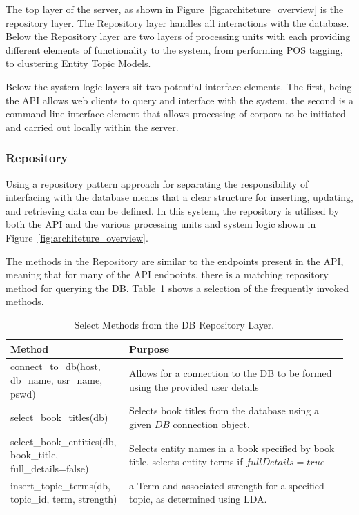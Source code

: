 \documentclass[10pt]{report}
\begin{document}
The top layer of the server, as shown in Figure~\ref{fig:architeture_overview} is the repository layer. The Repository layer handles all interactions with the database. Below the Repository layer are two layers of processing units with each providing different elements of functionality to the system, from performing POS tagging, to clustering Entity Topic Models.

Below the system logic layers sit two potential interface elements. The first, being the API allows web clients to query and interface with the system, the second is a command line interface element that allows processing of corpora to be initiated and carried out locally within the server.

\subsubsection{Repository}
Using a repository pattern approach for separating the responsibility of interfacing with the database means that a clear structure for inserting, updating, and retrieving data can be defined. In this system, the repository is utilised by both the API and the various processing units and system logic shown in Figure~\ref{fig:architeture_overview}.

The methods in the Repository are similar to the endpoints present in the API, meaning that for many of the API endpoints, there is a matching repository method for querying the DB. Table~\ref{tab:repository_methods} shows a selection of the frequently invoked methods.

\renewcommand{\arraystretch}{2.0}
\renewcommand{\baselinestretch}{1.0}\normalsize
\begin{table}[h!]
  \centering
  \begin{tabular}{>{\raggedright}p{0.34\linewidth} | p{0.63\linewidth}}
    Method & Purpose\\
    \hline
    connect\_to\_db(host, db\_name, usr\_name, pswd) & Allows for a connection to the DB to be formed using the provided user details\\
    select\_book\_titles(db) & Selects book titles from the database using a given $DB$ connection object.\\
    select\_book\_entities(db, book\_title, full\_details=false) & Selects entity names in a book specified by book title, selects entity terms if $fullDetails=true$\\
    insert\_topic\_terms(db, topic\_id, term, strength) & a Term and associated strength for a specified topic, as determined using LDA. \\
    
  \end{tabular}
  \caption{Select Methods from the DB Repository Layer. \label{tab:repository_methods}}
\end{table}
\renewcommand{\arraystretch}{1.0}
\renewcommand{\baselinestretch}{2.0}\normalsize
\end{document}
